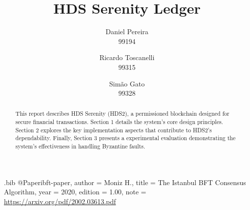 \usepackage{filecontents}

\begin{filecontents}{\jobname.bib}
@Paper{ibft-paper,
  author =       {Moniz H.},
  title =        {The Istanbul BFT Consensus Algorithm},
  year =         2020,
  edition =      {1.00},
  note =         {\url{https://arxiv.org/pdf/2002.03613.pdf}}
}
\end{filecontents}



\date{}

\title{\Large \bf HDS Serenity Ledger}

\author{
{\rm Daniel Pereira}\\
99194
\and
{\rm Ricardo Toscanelli}\\
99315
\and
{\rm Simão Gato}\\
99328
} %

\maketitle

\begin{abstract}

This report describes HDS Serenity (HDS2), a permissioned blockchain designed for secure financial transactions.  Section 1 details the system's core design principles. Section 2 explores the key implementation aspects that contribute to HDS2's dependability. Finally, Section 3 presents a experimental evaluation demonstrating the system's effectiveness in handling Byzantine faults.

\end{abstract}

